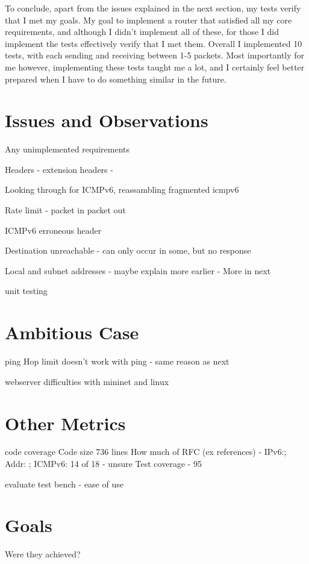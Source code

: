 \documentclass[12pt,a4paper,twoside,openright]{report}
\begin{document}
\bigskip

To conclude, apart from the issues explained in the next section, my tests verify that I met my goals.  My goal to implement a router that satisfied all my core requirements, and although I didn't implement all of these, for those I did implement the tests effectively verify that I met them.  Overall I implemented 10 tests, with each sending and receiving between 1-5 packets. Most importantly for me however, implementing these tests taught me a lot, and I certainly feel better prepared when I have to do something similar in the future.

\section{Issues and Observations}

Any unimplemented requirements

Headers - extension headers - 

Looking through for ICMPv6, reassambling fragmented icmpv6

Rate limit - packet in packet out

ICMPv6 erroneous header

Destination unreachable - can only occur in some, but no response

Local and subnet addresses - maybe explain more earlier - More in next

unit testing

\section{Ambitious Case}
ping
Hop limit doesn’t work with ping - same reason as next

webserver
difficulties with mininet and linux

\section{Other Metrics}
code coverage
Code size 736 lines
How much of RFC (ex references) - IPv6:; Addr: ; ICMPv6: 14 of 18  - unsure
Test coverage - 95%

evaluate test bench - ease of use

\section{Goals}

Were they achieved?
\end{document}
